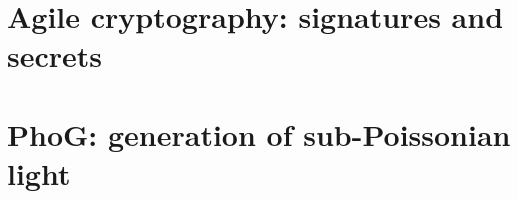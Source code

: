 \documentclass[ twoside,openright,titlepage,numbers=noenddot,%
                headinclude,footinclude,cleardoublepage=empty,abstract=on,
                BCOR=5mm,paper=a4,fontsize=11pt
                ]{scrreprt}
\begin{document}
\frenchspacing
\raggedbottom
{} %


\pagestyle{empty}
\maketitle
\cleardoublepage


\pagestyle{plain}
\tableofcontents
\cleardoublepage




\setcounter{page}{1}
\pagestyle{scrheadings}



\part{Agile cryptography: signatures and secrets}




\part{PhoG: generation of sub-Poissonian light}



\appendix







\printbibliography
\end{document}
